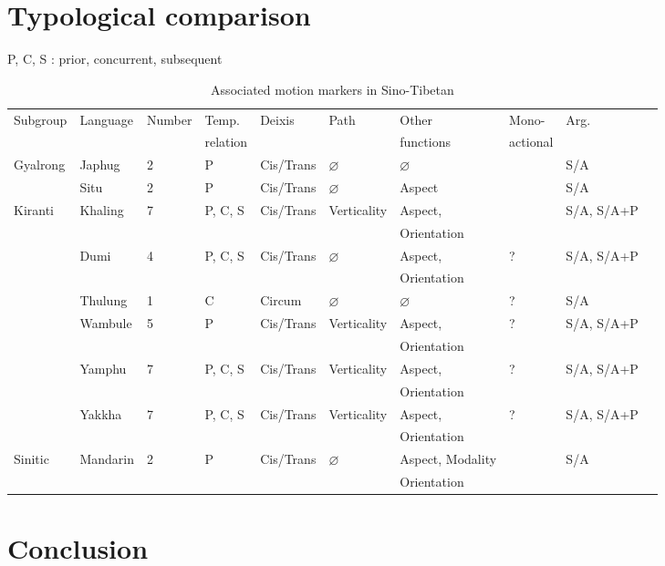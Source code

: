\documentclass[oneside,a4paper,11pt]{article}
\newcommand{\Y}{\Checkmark}
\newcommand{\N}{\XSolidBrush}
\begin{document}
\section{Typological comparison}
\begin{landscape}
P, C, S : prior, concurrent, subsequent
\begin{table}[H]
\caption{Associated motion markers in Sino-Tibetan} \label{tab:am.st} \centering
\begin{tabular}{llllllllll}
\toprule
Subgroup&Language  &Number &Temp. & Deixis & Path & Other & Mono- &Arg.\\
&&&relation &&&functions& actional & \\
\midrule
Gyalrong&Japhug & 2&P & Cis/Trans & $\varnothing$ &  $\varnothing$ & \Y &S/A \\
&Situ &2&P & Cis/Trans & $\varnothing$ & Aspect&\N &S/A \\
\midrule
Kiranti &Khaling & 7&P, C, S &Cis/Trans & Verticality & Aspect,  &  \N  &S/A, S/A+P \\
&&&&&&Orientation&&\\
&Dumi & 4 &P, C, S &Cis/Trans &  $\varnothing$ & Aspect,  &  ?&S/A, S/A+P \\
  &&&&&&Orientation&&\\
&Thulung & 1 & C  &Circum &  $\varnothing$ & $\varnothing$ &?  &S/A  \\
&Wambule & 5 & P  &Cis/Trans &  Verticality & Aspect,  &?  &S/A, S/A+P \\
     &&&&&&Orientation&&\\
&Yamphu & 7 & P, C, S  & Cis/Trans &  Verticality & Aspect,  &?  &S/A, S/A+P \\
        &&&&&&Orientation&&\\
&Yakkha & 7 & P, C, S  & Cis/Trans &  Verticality & Aspect,  &?  &S/A, S/A+P \\
        &&&&&&Orientation&&\\
\midrule
Sinitic & Mandarin &2& P & Cis/Trans & $\varnothing$ &Aspect,  Modality&\N   &S/A  \\
        &&&&&&Orientation&&\\
\bottomrule
\end{tabular}
\end{table}

\end{landscape}
\section{Conclusion}




 
\end{document}
